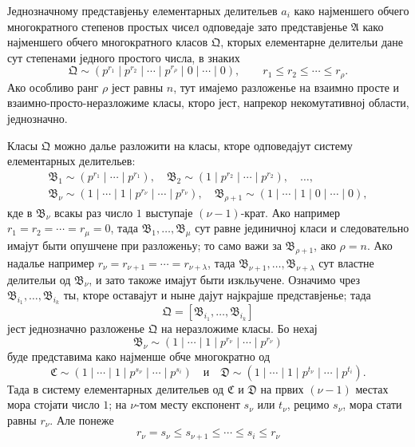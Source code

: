 ﻿\documentclass[11pt]{article}
\begin{document}
Једнозначному представјеньу елементарных делительев \(a_i\) како најменшего обчего многократного степенов простых чисел одповедаје зато представјенье \(\mathfrak A\) како најменшего обчего многократного класов \(\mathfrak Q\), кторых елементарне делительи дане сут степенами једного простого числа, в знаких
\[
 \mathfrak Q\sim(p^{r_1}\mid p^{r_2}\mid\cdots\mid p^{r_\rho}\mid0\mid\cdots\mid0),
 \qquad r_1\le r_2\le\cdots\le r_\rho.
\]
Ако особливо ранг \(\rho\) јест равны \(n\), тут имајемо разложенье на взаимно просте и взаимно-просто-неразложиме класы, кторо јест, напрекор некомутативној области, једнозначно.

Класы \(\mathfrak Q\) можно далье разложити на класы, кторе одповедајут систему елементарных делительев:
\[
\begin{gathered}
 \mathfrak B_1\sim(p^{r_1}\mid\cdots\mid p^{r_1}),\quad
 \mathfrak B_2\sim(1\mid p^{r_2}\mid\cdots\mid p^{r_2}),\quad \ldots,\\
 \mathfrak B_\nu\sim(1\mid\cdots\mid1\mid p^{r_\nu}\mid\cdots\mid p^{r_\nu}),\quad
 \mathfrak B_{\rho+1}\sim(1\mid\cdots\mid1\mid0\mid\cdots\mid0),
\end{gathered}
\]
кде в \(\mathfrak B_\nu\) всакы раз число \(1\) выступаје \((\nu-1)\)-крат. Ако например \(r_1=r_2=\cdots=r_\mu=0\), тада \(\mathfrak B_1,\ldots,\mathfrak B_\mu\) сут равне јединичној класи и следовательно имајут быти опушчене при разложеньу; то само важи за \(\mathfrak B_{\rho+1}\), ако \(\rho=n\). Ако надалье например \(r_\nu=r_{\nu+1}=\cdots=r_{\nu+\lambda}\), тада \(\mathfrak B_{\nu+1},\ldots,\mathfrak B_{\nu+\lambda}\) сут властне делительи од \(\mathfrak B_\nu\), и зато такоже имајут быти изкльучене. Означимо чрез \(\mathfrak B_{i_1},\ldots,\mathfrak B_{i_k}\) ты, кторе оставајут и ныне дајут најкрајше представјенье; тада
\[
 \mathfrak Q=[\mathfrak B_{i_1},
\ldots,\mathfrak B_{i_k}]
\]
јест једнозначно разложенье \(\mathfrak Q\) на неразложиме класы. Бо нехај
\[
 \mathfrak B_\nu\sim(1\mid\cdots\mid1\mid p^{r_\nu}\mid\cdots\mid p^{r_\nu})
\]
буде представима како најменше обче многократно од
\[
 \mathfrak C\sim(1\mid\cdots\mid1\mid p^{s_\nu}\mid\cdots\mid p^{s_i})
 \quad\text{и}\quad
 \mathfrak D\sim(1\mid\cdots\mid1\mid p^{t_\nu}\mid\cdots\mid p^{t_i}).
\]
Тада в систему елементарных делительев од \(\mathfrak C\) и \(\mathfrak D\) на првих \((\nu-1)\) местах мора стојати число \(1\); на \(\nu\)-том месту експонент \(s_\nu\) или \(t_\nu\), рецимо \(s_\nu\), мора стати равны \(r_\nu\). Але понеже
\[
 r_\nu=s_\nu\le s_{\nu+1}\le\cdots\le s_i\le r_\nu
\]
\end{document}
